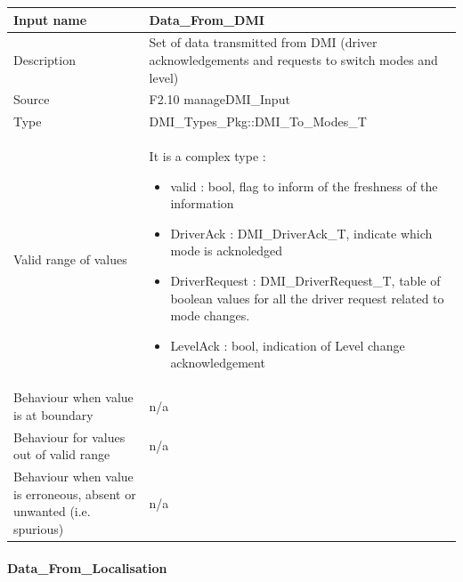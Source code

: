 \begin{longtable}{p{}p{}}
\toprule
Input name				& Data\_From\_DMI \\
\midrule
Description				& Set of data transmitted from DMI  (driver acknowledgements and requests to  switch modes and level) \\
\midrule
Source					& F2.10 manageDMI\_Input \\ 
\midrule
Type					& DMI\_Types\_Pkg::DMI\_To\_Modes\_T \\
\midrule
Valid range of values	& It is a complex type : 
\begin{itemize}
\item valid :  bool,  flag to inform of the freshness of the information
\item DriverAck : DMI\_DriverAck\_T, indicate which mode is acknoledged
\item DriverRequest : DMI\_DriverRequest\_T, table of boolean values for all the driver request related to  mode changes.
\item LevelAck : bool, indication of Level  change acknowledgement
\end{itemize} \\
\midrule
Behaviour when value is at boundary	& n/a \\ 
\midrule
Behaviour for values out of valid range	& n/a \\ 
\midrule
Behaviour when value is erroneous, absent or unwanted (i.e. spurious) & n/a \\ 
\bottomrule
\end{longtable}

\paragraph{Data\_From\_Localisation}


